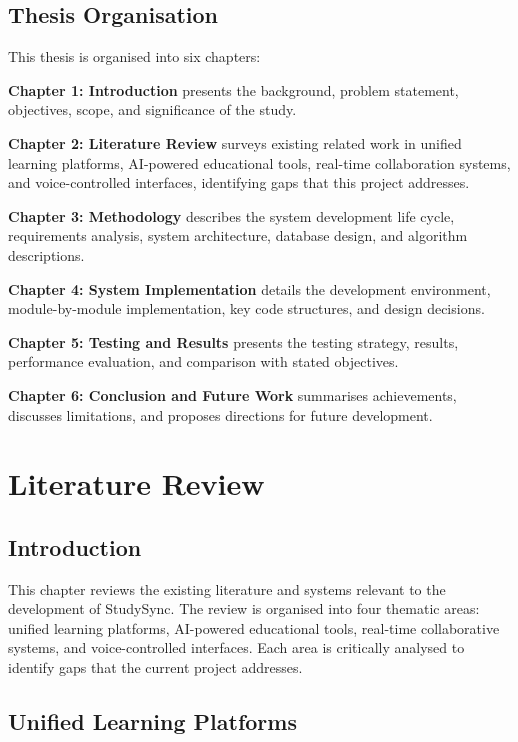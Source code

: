 \documentclass[12pt,a4paper]{report}
\begin{document}
\section{Thesis Organisation}

This thesis is organised into six chapters:

\textbf{Chapter 1: Introduction} presents the background, problem statement, objectives, scope, and significance of the study.

\textbf{Chapter 2: Literature Review} surveys existing related work in unified learning platforms, AI-powered educational tools, real-time collaboration systems, and voice-controlled interfaces, identifying gaps that this project addresses.

\textbf{Chapter 3: Methodology} describes the system development life cycle, requirements analysis, system architecture, database design, and algorithm descriptions.

\textbf{Chapter 4: System Implementation} details the development environment, module-by-module implementation, key code structures, and design decisions.

\textbf{Chapter 5: Testing and Results} presents the testing strategy, results, performance evaluation, and comparison with stated objectives.

\textbf{Chapter 6: Conclusion and Future Work} summarises achievements, discusses limitations, and proposes directions for future development.

\chapter{Literature Review}

\section{Introduction}

This chapter reviews the existing literature and systems relevant to the development of StudySync. The review is organised into four thematic areas: unified learning platforms, AI-powered educational tools, real-time collaborative systems, and voice-controlled interfaces. Each area is critically analysed to identify gaps that the current project addresses.

\section{Unified Learning Platforms}
\end{document}
